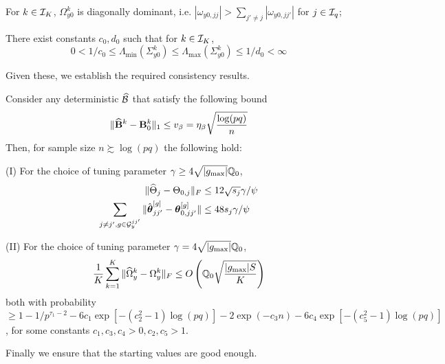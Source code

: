\vspace{1em}
 For $k \in {\cal{I}}_K$, $\Omega_{y0}^k$ is diagonally dominant, i.e.
%
$
|\omega_{y0,jj} | > \sum_{j' \neq j} |\omega_{y0,jj'} |
$
for $j \in {\cal{I}}_q$;

 There exist constants $c_0, d_0$ such that for $k \in {\cal{I}}_K$,
%
\[
0 < 1/c_0 \leq \Lambda_{\min} (\Sigma_{y 0}^k) \leq \Lambda_{\max} (\Sigma_{y 0}^k) \leq 1/d_0 < \infty
\]
%

\noindent Given these, we establish the required consistency results.

\begin{Theorem}\label{corollary:thm-Omega}
Consider any deterministic $\widehat {{\cal{B}}}$ that satisfy the following bound
%
$$
\| \widehat {{\mathbf{B}}}^k - {\mathbf{B}}_0^k \|_1 \leq v_\beta = \eta_\beta \sqrt{ \frac{ \log(pq)}{n}}
$$
%
Then, for sample size $n \succsim \log (pq)$ the following hold:

\noindent (I) For the choice of tuning parameter $\gamma \geq 4 \sqrt{| g_{\max}|} {\mathbb{Q}}_0$,
%
\begin{align}
\| \widehat \Theta_j - \Theta_{0,j} \|_F & \leq 12 \sqrt{s_j} \gamma / \psi \label{eqn:theta-norm-bound-1}\\
\sum_{j \neq j', g \in {\cal{G}}_y^{jj'}} \| \hat {{\boldsymbol{\theta}}}_{jj'}^{[g]} - {\boldsymbol{\theta}}_{0,jj'}^{[g]} \| & \leq 48 s_j \gamma / \psi \label{eqn:theta-norm-bound-2}
\end{align}
%

\noindent (II) For the choice of tuning parameter $\gamma = 4 \sqrt{| g_{\max}|} {\mathbb{Q}}_0$,
%
\begin{align}\label{eqn:OmegaBounds0}
\frac{1}{K} \sum_{k=1}^K \| \widehat \Omega_y^k - \Omega_y^k \|_F \leq
O \left( {\mathbb{Q}}_0 \sqrt{\frac{| g_{\max}| S}{K}} \right)
\end{align}
%
both with probability $\geq 1 - 1/p^{\tau_1-2} - 6c_1 \exp [-(c_2^2-1) \log(pq)] - 2 \exp (- c_3 n) - 6c_4 \exp [-(c_5^2-1) \log(pq)]$, for some constants $c_1, c_3, c_4 > 0, c_2, c_5 > 1$.
\end{Theorem}

Finally we ensure that the starting values are good enough.

